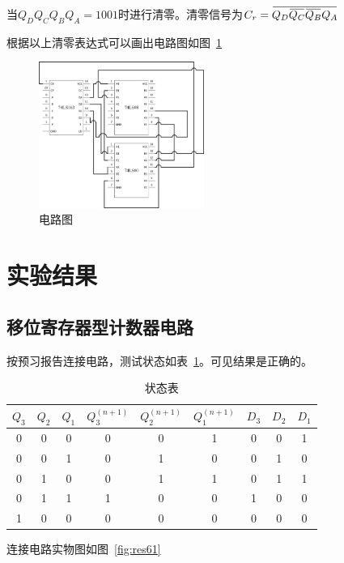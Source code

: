 \documentclass[a4paper,twoside]{ctexart}
\newcommand{\ols}[1]{\mskip.5\thinmuskip\overline{\mskip-.5\thinmuskip {#1} \mskip-.5\thinmuskip}\mskip.5\thinmuskip}
\begin{document}
\begin{spacing}{1.2}
当$Q_DQ_CQ_BQ_A=1001$时进行清零。清零信号为$C_r=\ols{Q_D\ols{Q_C}\ols{Q_B}Q_A}$

根据以上清零表达式可以画出电路图如图~\ref{fig:54}

\begin{figure}[htbp]
	\centering
	\caption{电路图}
	\label{fig:54}
	\includegraphics[width=0.48\textwidth]{54.png}
\end{figure}

\clearpage

\section{实验结果}

\subsection{移位寄存器型计数器电路}

按预习报告连接电路，测试状态如表~\ref{tbl:res61}。可见结果是正确的。

\begin{table}[htbp]
	\centering
	\caption{状态表}
	\label{tbl:res61}
	\begin{tabular}{ccc|ccc|ccc}
		\toprule
		\hline
		$Q_3$&$Q_2$&$Q_1$&$Q_3^{(n+1)}$&$Q_2^{(n+1)}$&$Q_1^{(n+1)}$&$D_3$&$D_2$&$D_1$ \\
		\hline
		0&0&0&0&0&1&0&0&1 \\
		0&0&1&0&1&0&0&1&0 \\
		0&1&0&0&1&1&0&1&1 \\
		0&1&1&1&0&0&1&0&0 \\
		1&0&0&0&0&0&0&0&0 \\
		\hline
		\bottomrule
	\end{tabular}
\end{table}

连接电路实物图如图~\ref{fig:res61}


\end{spacing}
\end{document}

